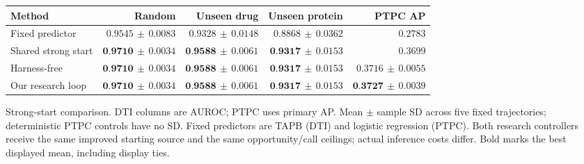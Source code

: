 \centering\small\setlength{\tabcolsep}{3pt}
\begin{tabularx}{\linewidth}{@{}Xrrrr@{}}
\toprule
Method & Random & Unseen drug & Unseen protein & PTPC AP \\
\midrule
Fixed predictor & $0.9545\,\pm\,0.0083$ & $0.9328\,\pm\,0.0148$ & $0.8868\,\pm\,0.0362$ & $0.2783$ \\
Shared strong start & $\textbf{0.9710}\,\pm\,0.0034$ & $\textbf{0.9588}\,\pm\,0.0061$ & $\textbf{0.9317}\,\pm\,0.0153$ & $0.3699$ \\
Harness-free & $\textbf{0.9710}\,\pm\,0.0034$ & $\textbf{0.9588}\,\pm\,0.0061$ & $\textbf{0.9317}\,\pm\,0.0153$ & $0.3716\,\pm\,0.0055$ \\
Our research loop & $\textbf{0.9710}\,\pm\,0.0034$ & $\textbf{0.9588}\,\pm\,0.0061$ & $\textbf{0.9317}\,\pm\,0.0153$ & $\textbf{0.3727}\,\pm\,0.0039$ \\
\bottomrule\end{tabularx}
\caption{Strong-start comparison. DTI columns are AUROC; PTPC uses primary AP. Mean $\pm$ sample SD across five fixed trajectories; deterministic PTPC controls have no SD. Fixed predictors are TAPB (DTI) and logistic regression (PTPC). Both research controllers receive the same improved starting source and the same opportunity/call ceilings; actual inference costs differ. Bold marks the best displayed mean, including display ties.}
\label{tab:strong-start}
